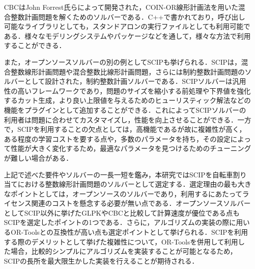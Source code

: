           \par CBCはJohn Forrest氏らによって開発された，COIN-OR線形計画法を用いた混合整数計画問題を解くためのソルバーである．C++で書かれており，呼び出し可能なライブラリとしても，スタンドアロンの実行ファイルとしても利用可能である．様々なモデリングシステムやパッケージなどを通して，様々な方法で利用することができる．
          
          \par また，オープンソースソルバーの別の例としてSCIPも挙げられる．SCIPは，混合整数線形計画問題や混合整数比線形計画問題，さらには制約整数計画問題のソルバーとして設計された，制約整数計画ソルバーである．SCIPソルバーは汎用性の高いフレームワークであり，問題のサイズを縮小する前処理や下界値を強化するカット生成，より良い上限値を与えるためのヒューリスティック解法などの機能をプラグインとして追加することができる．これによってSCIPソルバーの利用者は問題に合わせてカスタマイズし，性能を向上させることができる．一方で，SCIPを利用することの欠点としては，高機能であるが故に複雑性が高く，ある程度の学習コストを要する点や，多数のパラメータを持ち，その設定によって性能が大きく変化するため，最適なパラメータを見つけるためのチューニングが難しい場合がある．
          
          \par 上記で述べた要件やソルバーの一長一短を鑑み，本研究ではSCIPを自転車割り当てにおける整数線形計画問題のソルバーとして選定する．選定理由の最も大きなポイントとしては，オープンソースのソルバーであり，利用するにあたってライセンス関連のコストを懸念する必要が無い点である．オープンソースソルバーとしてSCIP以外に挙げたGLPKやCBCと比較して計算速度が優位である点もSCIPを選定したポイントの1つである．さらに，アルゴリズムの実装の際に用いるOR-Toolsとの互換性が高い点も選定ポイントとして挙げられる．SCIPを利用する際のデメリットとして挙げた複雑性について，OR-Toolsを併用して利用した場合，比較的シンプルにアルゴリズムを実装することが可能となるため，SCIPの長所を最大限生かした実装を行えることが期待される．
          
